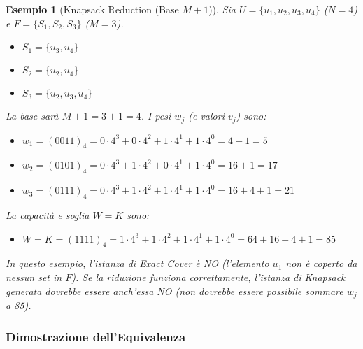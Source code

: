 \documentclass[a4paper]{article}
\newtheorem{example}{Esempio}
\begin{document}
\begin{example}[Knapsack Reduction (Base $M+1$)]
Sia $U = \{u_1, u_2, u_3, u_4\}$ ($N=4$) e $F = \{S_1, S_2, S_3\}$ ($M=3$).
\begin{itemize}
    \item $S_1 = \{u_3, u_4\}$
    \item $S_2 = \{u_2, u_4\}$
    \item $S_3 = \{u_2, u_3, u_4\}$
\end{itemize}
La base sarà $M+1 = 3+1 = 4$.
I pesi $w_j$ (e valori $v_j$) sono:
\begin{itemize}
    \item $w_1 = (0011)_4 = 0 \cdot 4^3 + 0 \cdot 4^2 + 1 \cdot 4^1 + 1 \cdot 4^0 = 4+1 = 5$
    \item $w_2 = (0101)_4 = 0 \cdot 4^3 + 1 \cdot 4^2 + 0 \cdot 4^1 + 1 \cdot 4^0 = 16+1 = 17$
    \item $w_3 = (0111)_4 = 0 \cdot 4^3 + 1 \cdot 4^2 + 1 \cdot 4^1 + 1 \cdot 4^0 = 16+4+1 = 21$
\end{itemize}
La capacità e soglia $W=K$ sono:
\begin{itemize}
    \item $W = K = (1111)_4 = 1 \cdot 4^3 + 1 \cdot 4^2 + 1 \cdot 4^1 + 1 \cdot 4^0 = 64+16+4+1 = 85$
\end{itemize}
In questo esempio, l'istanza di Exact Cover è NO (l'elemento $u_1$ non è coperto da nessun set in $F$). Se la riduzione funziona correttamente, l'istanza di Knapsack generata dovrebbe essere anch'essa NO (non dovrebbe essere possibile sommare $w_j$ a 85).
\end{example}

\subsubsection{Dimostrazione dell'Equivalenza}
\end{document}
